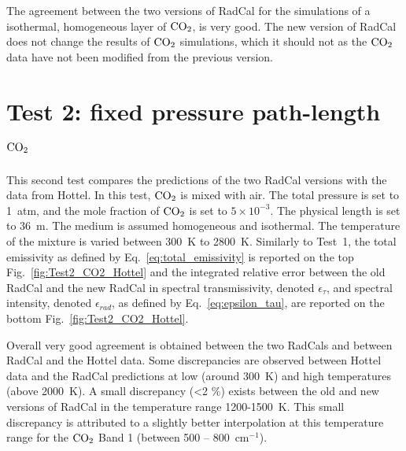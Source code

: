 The agreement between the two versions of RadCal for the simulations of a isothermal, homogeneous layer of ${\rm CO_2}$, is very good. The new version of RadCal does not change the results of ${\rm CO_2}$ simulations, which it should not as the $\rm CO_2$ data have not been modified from the previous version.



\section{Test 2: fixed pressure path-length {$\rm CO_2$ }}

This second test compares the predictions of the two RadCal versions with the data from Hottel. In this test, $\rm CO_2$ is mixed with air. The total pressure is  set to 1~atm, and the mole fraction of $\rm CO_2$ is set to $5 \times 10^{-3}$. The physical length is set to 36~m. The medium is assumed homogeneous and isothermal. The temperature of the mixture is varied between 300~K to 2800~K. Similarly to Test~1, the total emissivity as defined by Eq.~\ref{eq:total_emissivity} is reported on the top Fig.~\ref{fig:Test2_CO2_Hottel} and the integrated relative error between the old RadCal and the new RadCal in spectral transmissivity, denoted $\epsilon_{\tau}$, and spectral intensity, denoted $\epsilon_{rad}$, as defined by Eq.~\ref{eq:epsilon_tau}, are reported on the bottom Fig.~\ref{fig:Test2_CO2_Hottel}.

Overall very good agreement is obtained between the two RadCals and between RadCal and the Hottel data. Some discrepancies are observed between Hottel data and the RadCal predictions at low (around 300~K) and high temperatures (above 2000~K).
A small discrepancy (<2 \%) exists between the old and new versions of RadCal in the temperature range 1200-1500~K. This small discrepancy is attributed to a slightly better interpolation at this temperature range for the $\rm CO_2$ Band 1 (between 500 -- 800~cm$^{-1}$).

